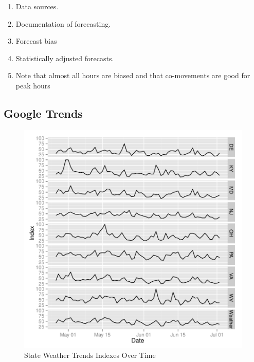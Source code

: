 \documentclass{article}
\begin{document}
    \begin{enumerate}
      \item Data sources.
      \item Documentation of forecasting.
      \item Forecast bias
      \item Statistically adjusted forecasts.
      \item Note that almost all hours are biased and that co-movements are good for peak hours
    \end{enumerate}

  \subsection{Google Trends}

\begin{figure}
\begin{center}
\caption{State Weather Trends Indexes Over Time}
\includegraphics{DraftPaper-005}
\end{center}
\end{figure}
\end{document}
